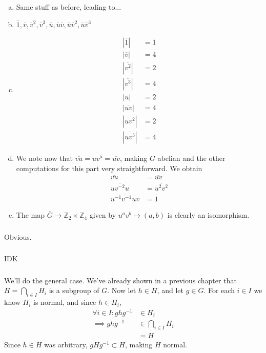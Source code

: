 \documentclass{article}
\newcommand{\ints}{\mathbb{Z}}
\newcommand{\abs}[1]{| #1 |}
\newcommand{\inv}[1]{ {#1}^{-1} }
\renewcommand{\bar}{\overline}
\begin{document}
\subsubsection{}\label{ex1p19}
\begin{enumerate}[(a)]
\item Same stuff as before, leading to...
\item $\bar{1},\bar{v},\bar{v}^2,\bar{v}^3,\bar{u},\bar{u}\bar{v},\bar{u}\bar{v}^2,\bar{u}\bar{v}^3$
\item
\begin{align*}
\abs{\bar{1}} &= 1\\
\abs{\bar{v}} &= 4\\
\abs{\bar{v^2}} &= 2\\
\abs{\bar{v^3}} &= 4\\
\abs{\bar{u}} &= 2\\
\abs{\bar{uv}} &= 4\\
\abs{\bar{uv^2}} &= 2\\
\abs{\bar{uv^3}} &= 4
\end{align*}
\item We note now that $\bar{vu} = \bar{uv^5} = \bar{uv}$, making $G$ abelian and the other computations for this part very straightforward. We obtain
\begin{align*}
\bar{vu} &= \bar{uv}\\
\bar{uv^{-2}u} &= \bar{u^2v^2}\\
\bar{\inv{u}\inv{v}uv} &= \bar{1}
\end{align*}
\item The map $\bar{G} \to \ints_2 \times \ints_4$ given by $u^av^b \mapsto (a,b)$ is clearly an isomorphism.
\end{enumerate}
\subsubsection{}\label{ex1p20}
Obvious.
\subsubsection{}\label{ex1p21}
IDK
\subsubsection{}\label{ex1p22}
We'll do the general case. We've already shown in a previous chapter that $H=\bigcap_{i\in I} H_i$ is a subgroup of $G$. Now let $h\in H$, and let $g\in G$. For each $i\in I$ we know $H_i$ is normal, and since $h\in H_i$,
\begin{align*}
\forall i\in I: gh\inv{g} &\in H_i\\
\implies gh\inv{g} &\in \bigcap_{i\in I} H_i\\
&= H
\end{align*}
Since $h\in H$ was arbitrary, $gH\inv{g} \subset H$, making $H$ normal.
\end{document}
